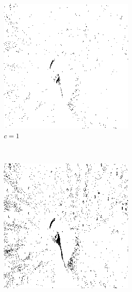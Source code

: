 \documentclass{article}
\begin{document}
\begin{enumerate}[label=(\alph*)]
    \begin{figure}[!htb]
        \centering
        \begin{subfigure}[b]{0.3\textwidth}
            \includegraphics[width=\textwidth]{img/ILT1.png}
            \caption{$c = 1$}
        \end{subfigure}
        ~
        \begin{subfigure}[b]{0.3\textwidth}
            \includegraphics[width=\textwidth]{img/ILT2.png}

\end{subfigure}
\end{figure}
\end{enumerate}
\end{document}
